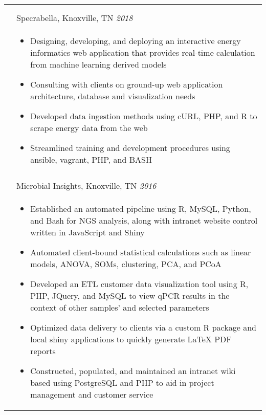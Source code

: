 \documentclass[10pt]{article}%
\begin{document}
\begin{minipage}[ht]{.8\linewidth}
\begin{tabularx}{\linewidth}{p{1.8cm}M}
\begin{itemize}[topsep=-12pt,parsep=0em]
        \end{itemize} \\
        &  \\
      & Specrabella, Knoxville, TN \textit{2018  } \\
      & \begin{itemize}[topsep=-12pt,parsep=0em]
         \setlength\itemsep{0em}
         \item Designing, developing, and deploying an interactive energy informatics web application that provides real-time calculation from machine learning derived models %
         \item Consulting with clients on ground-up web application architecture, database and visualization needs%
          \item Developed data ingestion methods using cURL, PHP, and R to scrape energy data from the web %
          \item Streamlined training and development procedures using ansible, vagrant, PHP, and BASH %
      \end{itemize} \\
      &  \\
      & Microbial Insights, Knoxville, TN \textit{2016 } \\
      & \begin{itemize}[topsep=-12pt,parsep=0em]
         \setlength\itemsep{0em}
         \item Established an automated pipeline using R, MySQL, Python, and Bash for NGS analysis, along with intranet website control written in JavaScript and Shiny  %
         \item Automated client-bound statistical calculations such as linear models, ANOVA, SOMs, clustering, PCA, and PCoA %
         \item Developed an ETL customer data visualization tool using R, PHP, JQuery, and MySQL to view qPCR results in the context of other samples' and selected parameters %
         \item Optimized data delivery to clients via a custom R package and local shiny applications to quickly generate \LaTeX{} PDF reports  %
         \item Constructed, populated, and maintained an intranet wiki based using PostgreSQL and PHP to aid in project management and customer service
        \end{itemize} \\

\end{tabularx}
\end{minipage}
\end{document}
